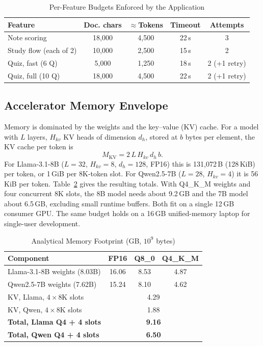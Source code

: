 \documentclass[conference]{IEEEtran}
\begin{document}
\begin{table}[t]
\caption{Per-Feature Budgets Enforced by the Application}
\label{tab:budget}
\centering
\setlength{\tabcolsep}{4pt}
\begin{tabular}{@{}lcccc@{}}
\toprule
\textbf{Feature} & \textbf{Doc. chars} & \textbf{$\approx$Tokens} & \textbf{Timeout} & \textbf{Attempts}\\
\midrule
Note scoring    & 18{,}000 & 4{,}500 & 22\,s & 3 \\
Study flow (each of 2) & 10{,}000 & 2{,}500 & 15\,s & 2 \\
Quiz, fast (6 Q)  & 5{,}000  & 1{,}250 & 18\,s & 2 (+1 retry)\\
Quiz, full (10 Q) & 18{,}000 & 4{,}500 & 22\,s & 2 (+1 retry)\\
\bottomrule
\end{tabular}
\end{table}

\subsection{Accelerator Memory Envelope}
Memory is dominated by the weights and the key--value (KV) cache. For a model
with $L$ layers, $H_{kv}$ KV heads of dimension $d_h$, stored at $b$ bytes
per element, the KV cache per token is
\begin{equation}
M_{\text{KV}} = 2\,L\,H_{kv}\,d_h\,b .
\end{equation}
For Llama-3.1-8B ($L{=}32$, $H_{kv}{=}8$, $d_h{=}128$, FP16) this is
131{,}072\,B (128\,KiB) per token, or 1\,GiB per 8K-token slot. For
Qwen2.5-7B ($L{=}28$, $H_{kv}{=}4$) it is 56\,KiB per token.
Table~\ref{tab:mem} gives the resulting totals. With Q4\_K\_M weights and four
concurrent 8K slots, the 8B model needs about 9.2\,GB and the 7B model about
6.5\,GB, excluding small runtime buffers. Both fit on a single 12\,GB
consumer GPU. The same budget holds on a 16\,GB unified-memory laptop for
single-user development.

\begin{table}[t]
\caption{Analytical Memory Footprint (GB, $10^9$ bytes)}
\label{tab:mem}
\centering
\setlength{\tabcolsep}{4pt}
\begin{tabular}{@{}lccc@{}}
\toprule
\textbf{Component} & \textbf{FP16} & \textbf{Q8\_0} & \textbf{Q4\_K\_M}\\
\midrule
Llama-3.1-8B weights (8.03B) & 16.06 & 8.53 & 4.87 \\
Qwen2.5-7B weights (7.62B)   & 15.24 & 8.10 & 4.62 \\
\midrule
KV, Llama, $4\times$8K slots & \multicolumn{3}{c}{4.29}\\
KV, Qwen,  $4\times$8K slots & \multicolumn{3}{c}{1.88}\\
\midrule
\textbf{Total, Llama Q4 + 4 slots} & \multicolumn{3}{c}{\textbf{9.16}}\\
\textbf{Total, Qwen Q4 + 4 slots}  & \multicolumn{3}{c}{\textbf{6.50}}\\
\bottomrule
\end{tabular}
\end{table}
\end{document}

